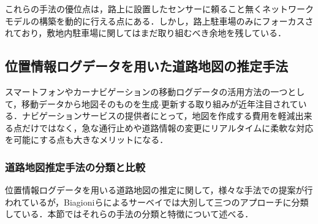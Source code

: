 これらの手法の優位点は，路上に設置したセンサーに頼ること無くネットワークモデルの構築を動的に行える点にある．しかし，路上駐車場のみにフォーカスされており，敷地内駐車場に関してはまだ取り組むべき余地を残している．


\subsection{位置情報ログデータを用いた道路地図の推定手法}
\label{gps-gen-map}

スマートフォンやカーナビゲーションの移動ログデータの活用方法の一つとして，移動データから地図そのものを生成$\cdot$更新する取り組みが近年注目されている．ナビゲーションサービスの提供者にとって，地図を作成する費用を軽減出来る点だけではなく，急な通行止めや道路情報の変更にリアルタイムに柔軟な対応を可能にする点も大きなメリットになる．


\subsubsection{道路地図推定手法の分類と比較}
位置情報ログデータを用いる道路地図の推定に関して，様々な手法での提案が行われているが，Biagioniらによるサーベイ\cite{Biagioni}では大別して三つのアプローチに分類している．本節ではそれらの手法の分類と特徴について述べる．


